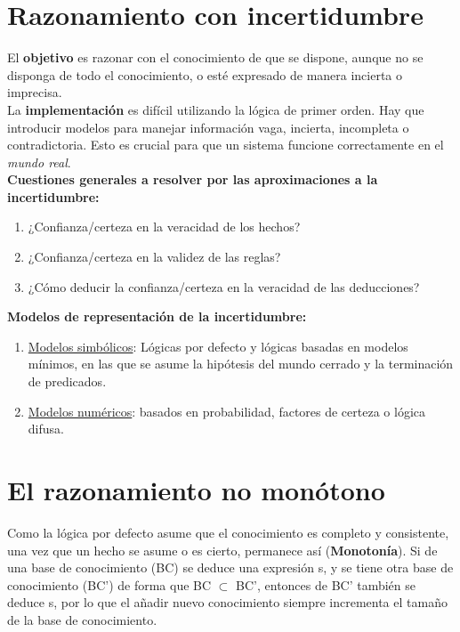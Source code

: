 \documentclass[12pt]{article}
\begin{document}
\section{Razonamiento con incertidumbre}
El \textbf{objetivo} es razonar con el conocimiento de que se dispone, aunque no se disponga de todo el conocimiento, o esté expresado de manera incierta o imprecisa.\\
La \textbf{implementación} es difícil utilizando la lógica de primer orden. Hay que introducir modelos para manejar información vaga, incierta, incompleta o contradictoria. Esto es crucial para que un sistema funcione correctamente en el \textit{mundo real}.\\

\textbf{Cuestiones generales a resolver por las aproximaciones a la incertidumbre:}
\begin{enumerate}
\item ¿Confianza/certeza en la veracidad de los hechos?
\item ¿Confianza/certeza en la validez de las reglas?
\item ¿Cómo deducir la confianza/certeza en la veracidad de las deducciones?
\end{enumerate}

\textbf{Modelos de representación de la incertidumbre:}
\begin{enumerate}
\item \underline{Modelos simbólicos}: Lógicas por defecto y lógicas basadas en modelos mínimos, en las que se asume la hipótesis del mundo cerrado y la terminación de predicados.
\item \underline{Modelos numéricos}: basados en probabilidad, factores de certeza o lógica difusa.
\end{enumerate}

\section{El razonamiento no monótono}
Como la lógica por defecto asume que el conocimiento es completo y consistente, una vez que un hecho se asume o es cierto, permanece así (\textbf{Monotonía}). Si de una base de conocimiento (BC) se deduce una expresión s, y se tiene otra base de conocimiento (BC') de forma que BC $\subset$ BC', entonces de BC' también se deduce s, por lo que el añadir nuevo conocimiento siempre incrementa el tamaño de la base de conocimiento.\\
\end{document}
